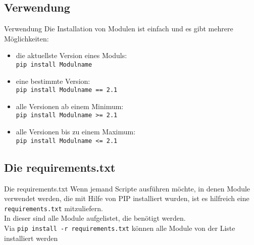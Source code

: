 \subsection{Verwendung}
\begin{frame}{Verwendung}
	Die Installation von Modulen ist einfach und es gibt mehrere M\"oglichkeiten:
	\begin{itemize}
		\item die aktuellste Version eines Moduls:\\
		\noindent\hspace*{.5cm} \texttt{pip install Modulname}
		\item eine bestimmte Version:\\
		\noindent\hspace*{.5cm} \texttt{pip install Modulname == 2.1}
		\item alle Versionen ab einem Minimum:\\
		\noindent\hspace*{.5cm} \texttt{pip install Modulname >= 2.1}
		\item alle Versionen bis zu einem Maximum:\\
		\noindent\hspace*{.5cm} \texttt{pip install Modulname <= 2.1}
	\end{itemize}
\end{frame}



\subsection{Die requirements.txt}
\begin{frame}{Die requirements.txt}
	Wenn jemand Scripte ausf\"uhren m\"ochte, in denen Module verwendet werden, die mit Hilfe von PIP installiert wurden, ist es hilfreich eine \texttt{requirements.txt} mitzuliefern.\\
	In dieser sind alle Module aufgelistet, die ben\"otigt werden.\\[.5cm]
	

	Via \texttt{pip install -r requirements.txt} k\"onnen alle Module von der Liste installiert werden
\end{frame}


